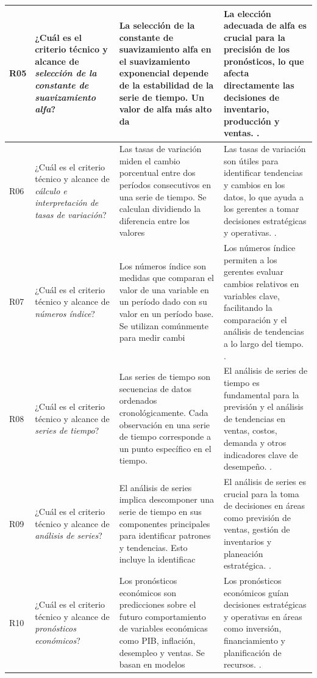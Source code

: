 {\begin{center}
\begin{longtable}{p{1.2cm}p{4.3cm}p{3.8cm}p{5.3cm}}
R05 & ¿Cuál es el criterio técnico y alcance de \textit{selección de la constante de suavizamiento alfa}? & La selección de la constante de suavizamiento alfa en el suavizamiento exponencial depende de la estabilidad de la serie de tiempo. Un valor de alfa más alto da & La elección adecuada de alfa es crucial para la precisión de los pronósticos, lo que afecta directamente las decisiones de inventario, producción y ventas. \citep{anderson2012,wackerly2010}.\\\hline
R06 & ¿Cuál es el criterio técnico y alcance de \textit{cálculo e interpretación de tasas de variación}? & Las tasas de variación miden el cambio porcentual entre dos períodos consecutivos en una serie de tiempo. Se calculan dividiendo la diferencia entre los valores & Las tasas de variación son útiles para identificar tendencias y cambios en los datos, lo que ayuda a los gerentes a tomar decisiones estratégicas y operativas. \citep{anderson2012,wackerly2010}.\\\hline
R07 & ¿Cuál es el criterio técnico y alcance de \textit{números índice}? & Los números índice son medidas que comparan el valor de una variable en un período dado con su valor en un período base. Se utilizan comúnmente para medir cambi & Los números índice permiten a los gerentes evaluar cambios relativos en variables clave, facilitando la comparación y el análisis de tendencias a lo largo del tiempo. \citep{anderson2012,wackerly2010}.\\\hline
R08 & ¿Cuál es el criterio técnico y alcance de \textit{series de tiempo}? & Las series de tiempo son secuencias de datos ordenados cronológicamente. Cada observación en una serie de tiempo corresponde a un punto específico en el tiempo. & El análisis de series de tiempo es fundamental para la previsión y el análisis de tendencias en ventas, costos, demanda y otros indicadores clave de desempeño. \citep{anderson2012,wackerly2010}.\\\hline
R09 & ¿Cuál es el criterio técnico y alcance de \textit{análisis de series}? & El análisis de series implica descomponer una serie de tiempo en sus componentes principales para identificar patrones y tendencias. Esto incluye la identificac & El análisis de series es crucial para la toma de decisiones en áreas como previsión de ventas, gestión de inventarios y planeación estratégica. \citep{anderson2012,wackerly2010}.\\\hline
R10 & ¿Cuál es el criterio técnico y alcance de \textit{pronósticos económicos}? & Los pronósticos económicos son predicciones sobre el futuro comportamiento de variables económicas como PIB, inflación, desempleo y ventas. Se basan en modelos  & Los pronósticos económicos guían decisiones estratégicas y operativas en áreas como inversión, financiamiento y planificación de recursos. \citep{anderson2012,wackerly2010}.\\\hline
\end{longtable}
\end{center}


}
